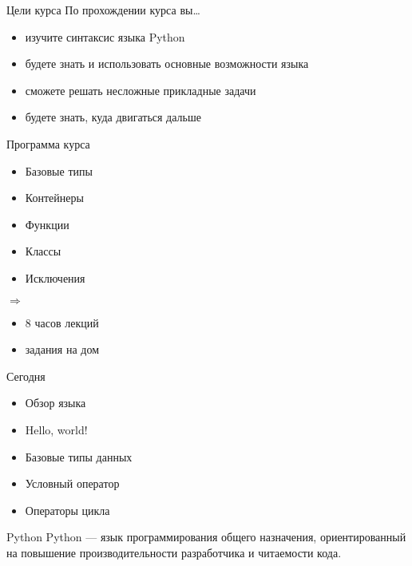 \documentclass[hyperref={pdftex,unicode}]{beamer}
\begin{document}
\begin{frame}{Цели курса}
  По прохождении курса вы\dots
  \begin{itemize}
    \item изучите синтаксис языка Python
    \item будете знать и использовать основные возможности языка
    \item сможете решать несложные прикладные задачи 
    \item будете знать, куда двигаться дальше
  \end{itemize}
\end{frame}

\begin{frame}{Программа курса}
  \begin{minipage}{0.4\linewidth}
    \begin{itemize}
    \item Базовые типы
    \item Контейнеры
    \item Функции
    \item Классы
    \item Исключения
    \end{itemize}
  \end{minipage}
  $ \Longrightarrow $
  \hfill
  \begin{minipage}{0.4\linewidth}
    \begin{itemize}  
    \item 8 часов лекций
    \item задания на дом
   \end{itemize}
  \end{minipage}
\end{frame}

\begin{frame}{Сегодня}
  \begin{itemize}
  \item Обзор языка
  \item Hello, world!
  \item Базовые типы данных
  \item Условный оператор
  \item Операторы цикла
  \end{itemize}
\end{frame}

\begin{frame}{Python}
  Python --- язык программирования общего назначения,
  ориентированный на повышение производительности разработчика и читаемости кода.
\end{frame}
\end{document}
